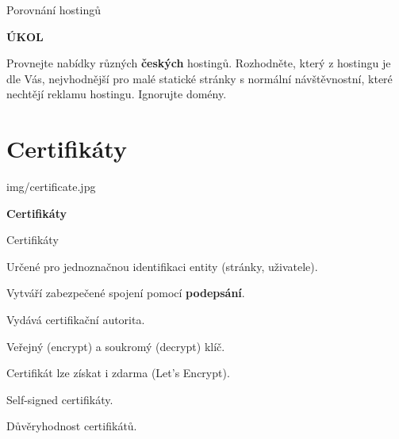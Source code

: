 \documentclass[aspectratio=169]{beamer}
\begin{document}
\begin{frame}{Porovnání hostingů}
    \begin{cardTiny}
        \begin{center}
            \textbf{ÚKOL}
        \end{center}
        \begin{flushleft}
            Provnejte nabídky různých \textbf{českých} hostingů. Rozhodněte, který z hostingu je dle Vás, nejvhodnější pro malé statické stránky s normální návštěvnostní, které nechtějí reklamu hostingu. Ignorujte domény. 
        \end{flushleft}
    \end{cardTiny}
\end{frame}



\section{Certifikáty}

\begin{frameImg}[width]{img/certificate.jpg}
    \vspace*{60mm}
    \begin{cardTiny}
        \vspace*{\fill}
        \begin{center}
            \textbf{Certifikáty}
        \end{center}
    \end{cardTiny}
\end{frameImg}

\begin{frame}{Certifikáty}
    \begin{cardTiny}
        \begin{flushleft}
            Určené pro jednoznačnou identifikaci entity (stránky, uživatele).
            
            Vytváří zabezpečené spojení pomocí \textbf{podepsání}.

            \vspace{2ex}

            Vydává certifikační autorita.

            Veřejný (encrypt) a soukromý (decrypt) klíč. 

            Certifikát lze získat i zdarma (Let's Encrypt). 
            
            \vspace{2ex}

            Self-signed certifikáty.

            Důvěryhodnost certifikátů.
        \end{flushleft}
    \end{cardTiny}
\end{frame}
\end{document}
